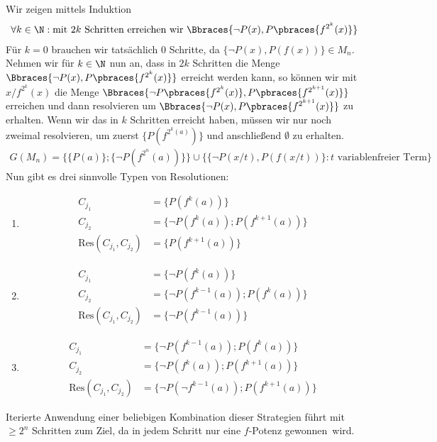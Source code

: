 \begin{solution}
	Wir zeigen mittels Induktion
	\begin{align*}
	\forall k \in \N: \text{mit } 2k \text{ Schritten erreichen wir } \Bbraces{\neg P(x), P\pbraces{f^{2^k}(x)}}
	\end{align*}
	Für $k = 0$ brauchen wir tatsächlich $0$ Schritte, da $\{\neg P(x),P(f(x))\} \in M_n$.
	Nehmen wir für $k \in \N$ nun an, dass in $2k$ Schritten die Menge
	$\Bbraces{\neg P(x), P\pbraces{f^{2^k}(x)}}$ erreicht werden kann,
	so können wir mit $x / f^{2^k}(x)$ die Menge
	$\Bbraces{\neg P\pbraces{f^{2^k}(x)}, P\pbraces{f^{2^{k + 1}}(x)}}$
	erreichen und dann resolvieren um $\Bbraces{\neg P(x), P\pbraces{f^{2^{k + 1}}(x)}}$ zu erhalten.
	Wenn wir das in $k$ Schritten erreicht haben, müssen wir nur noch zweimal resolvieren,
	um zuerst $\{P(f^{2^k(a)})\}$ und anschließend $\emptyset$ zu erhalten. \\
	\begin{align*}
		G(M_n) = \{\{P(a)\};\{\neg P(f^{2^n}(a))\}\} \cup
		\{\{\neg P(x/t), P(f(x/t))\}: t \text{ variablenfreier Term}\}
	\end{align*}
	Nun gibt es drei sinnvolle Typen von Resolutionen:
	\begin{enumerate}
		\item
		\begin{align*}
			C_{j_1} &= \{P(f^k(a))\} \\
			C_{j_2} &= \{\neg P(f^k(a));P(f^{k+1}(a))\} \\
			\mathrm{Res}(C_{j_1},C_{j_2}) &= \{P(f^{k+1}(a))\}
		\end{align*}
		\item
		\begin{align*}
		C_{j_1} &= \{\neg P(f^k(a))\} \\
		C_{j_2} &= \{\neg P(f^{k-1}(a));P(f^{k}(a))\} \\
		\mathrm{Res}(C_{j_1},C_{j_2}) &= \{\neg P(f^{k-1}(a))\}
		\end{align*}
		\item
		\begin{align*}
		C_{j_1} &= \{\neg P(f^{k-1}(a));P(f^{k}(a))\} \\
		C_{j_2} &= \{\neg P(f^{k}(a));P(f^{k+1}(a))\} \\
		\mathrm{Res}(C_{j_1},C_{j_2}) &= \{\neg P(\neg f^{k-1}(a));P(f^{k+1}(a))\}
		\end{align*}
	\end{enumerate}
	Iterierte Anwendung einer beliebigen Kombination dieser Strategien führt mit $\geq 2^n$
	Schritten zum Ziel, da in jedem Schritt nur eine $f$-Potenz \glqq gewonnen\grqq\ wird.
\end{solution}
